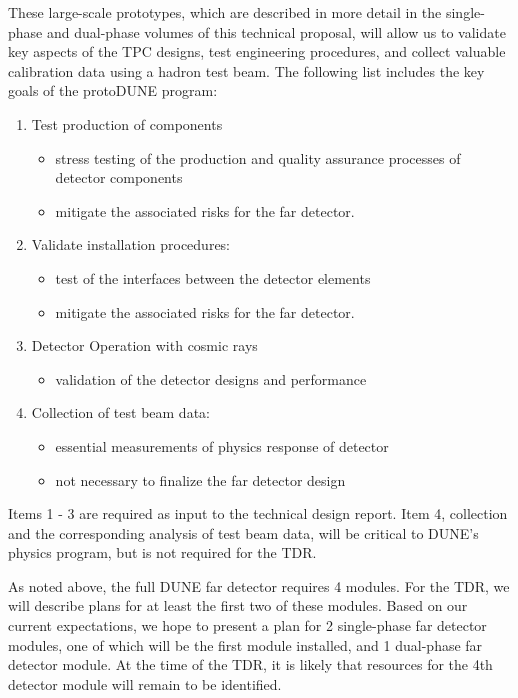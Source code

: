 These large-scale prototypes, which are described in more detail in the single-phase and dual-phase volumes of this technical proposal, will allow us to validate key aspects of the TPC designs, test engineering procedures, and collect valuable calibration data using a hadron test beam. The following list includes the key goals of the protoDUNE program:
\begin{enumerate}
\item Test production of components
\begin{itemize}
\item stress testing of the production and quality
assurance processes of detector components
\item mitigate the associated risks for the far detector.
\end{itemize}
\item Validate installation procedures:
\begin{itemize}
\item test of the interfaces between the detector
elements
\item mitigate the associated risks for the far detector.
\end{itemize}
\item Detector Operation with cosmic rays
\begin{itemize}
\item validation of the detector designs and
performance
\end{itemize}
\item Collection of test beam data:
\begin{itemize}
\item essential measurements of physics response of
detector
\item not necessary to finalize the far detector design
\end{itemize}
\end{enumerate}

Items 1 - 3 are required as input to the technical design report. Item 4, collection and the corresponding analysis of test beam data, will be critical to DUNE's physics program, but is not required for the TDR.

As noted above, the full DUNE far detector requires 4 modules. For the TDR, we will describe plans for at least the first two of these modules. Based on our current expectations, we hope to present a plan for 2 single-phase far detector modules, one of which will be the first module installed, and 1 dual-phase far detector module. At the time of the TDR, it is likely that resources for the 4th detector module will remain to be identified. 


